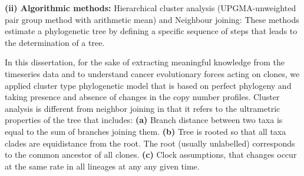 \textbf{(ii) Algorithmic methods:} Hierarchical cluster analysis (UPGMA-unweighted pair group method with arithmetic mean) and Neighbour joining:
These methods estimate a phylogenetic tree by defining a specific sequence of steps that leads to the determination of a tree.

In this dissertation, for the sake of extracting meaningful knowledge from the timeseries data and to understand cancer evolutionary forces acting on clones, we applied cluster type phylogenetic model that is based on perfect phylogeny and taking presence and absence of changes in the copy number profiles. 
Cluster analysis is different from neighbor joining in that it refers to the ultrametric properties of the tree that includes:
\textbf{(a)} Branch distance between two taxa is equal to the sum of branches joining them.
\textbf{(b)} Tree is rooted so that all taxa clades are equidistance from the root. The root (usually unlabelled) corresponds to the common ancestor of all clones.
\textbf{(c)} Clock assumptions, that changes occur at the same rate in all lineages at any any given time.




